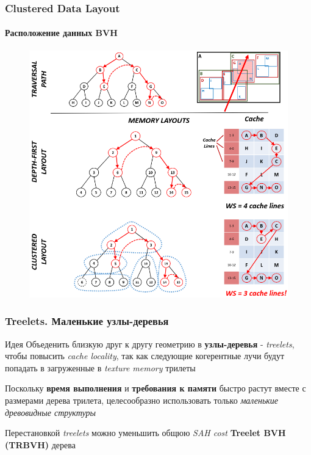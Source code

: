 \documentclass{beamer}
\begin{document}
\begin{frame}[t]
    \frametitle{Clustered Data Layout}
    \framesubtitle{Расположение данных BVH}
    \begin{figure}
        \includegraphics[height=0.75\textheight]{res/clusters.png}
    \end{figure}
\end{frame}

\begin{frame}[t]
    \frametitle{Treelets. Маленькие узлы-деревья}

    \begin{block}{Идея}
        Объеденить близкую друг к другу геометрию в \textbf{узлы-деревья} - \textit{treelets}, чтобы повысить
        \textit{cache locality}, так как следующие когерентные лучи будут попадать в загруженные в \textit{texture memory} трилеты
    \end{block}
    \begin{block}{}
        Поскольку \textbf{время выполнения} и \textbf{требования к памяти} быстро растут вместе с размерами дерева трилета,
        целесообразно использовать только \textit{маленькие древовидные структуры}
    \end{block}
    Перестановкой \textit{treelets} можно уменьшить общюю \textit{SAH cost} \textbf{Treelet BVH (TRBVH)} дерева
\end{frame}
\end{document}
